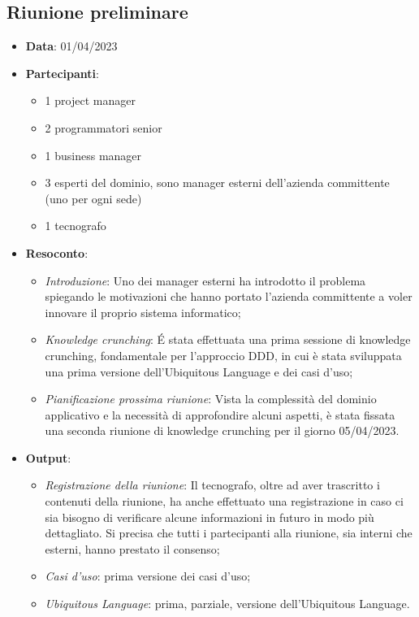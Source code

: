 \documentclass{article}
\begin{document}
  \subsection{Riunione preliminare}
  \begin{itemize}
    \item \textbf{Data}: 01/04/2023
    \item \textbf{Partecipanti}:
    \begin{itemize}
      \item 1 project manager
      \item 2 programmatori senior
      \item 1 business manager
      \item 3 esperti del dominio, sono manager esterni dell'azienda committente (uno per ogni sede)
      \item 1 tecnografo
    \end{itemize}
    \item \textbf{Resoconto}:
    \begin{itemize}
      \item \emph{Introduzione}: 
        Uno dei manager esterni ha introdotto il problema spiegando le motivazioni che hanno portato l'azienda 
          committente a voler innovare il proprio sistema informatico;
      \item \emph{Knowledge crunching}:
        É stata effettuata una prima sessione di knowledge crunching, fondamentale per l'approccio DDD, in cui è stata
          sviluppata una prima versione dell'Ubiquitous Language e dei casi d'uso;
      \item \emph{Pianificazione prossima riunione}:
        Vista la complessità del dominio applicativo e la necessità di approfondire alcuni aspetti, è stata fissata
          una seconda riunione di knowledge crunching per il giorno 05/04/2023.
    \end{itemize}
    \item \textbf{Output}:
    \begin{itemize}
      \item \emph{Registrazione della riunione}: 
        Il tecnografo, oltre ad aver trascritto i contenuti della riunione, ha anche effettuato una registrazione in caso
          ci sia bisogno di verificare alcune informazioni in futuro in modo più dettagliato. Si precisa che tutti i 
          partecipanti alla riunione, sia interni che esterni, hanno prestato il consenso;
      \item \emph{Casi d'uso}: prima versione dei casi d'uso;
      \item \emph{Ubiquitous Language}: prima, parziale, versione dell'Ubiquitous Language.
    \end{itemize}
  \end{itemize}
\end{document}
